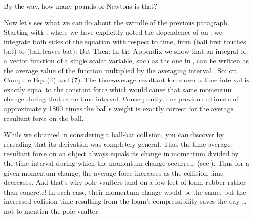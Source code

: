 {\tryit By the way, how many pounds or Newtons is that?

Now let's see what we can do about the  swindle of the
previous paragraph.
Starting with , where we have explicitly noted the
dependence of  on , we integrate both sides of the equation with
respect to time, from  (ball first touches bat) to 
(ball leaves bat):
%
%
But
%
%
Then:
%
%
In the Appendix we show that an integral of a vector function of a single
scalar variable, such as the one in , can be written as the average
value of the function  multiplied by the averaging interval
.
So:
%
%
or:
%
%
Compare Eqs.\,(4) and (7).
The time-average resultant force over a time interval  is exactly
equal to the constant force which would cause that same momentum change
during that same time interval.
Consequently, our previous estimate of approximately 1800~times the ball's
weight is exactly correct for the average resultant force on the ball.



While we obtained  in considering a
ball-bat collision, you can discover by rereading that its derivation was
completely general.
Thus the time-average resultant force on an object always equals its change
in momentum divided by the time interval during which the momentum change
occurred:  (see ).
Thus for a given momentum change, the average force increases as the
collision time decreases.
And that's why pole vaulters land on a few feet of foam rubber rather than
concrete!
In each case, their momentum change would be the same, but the increased
collision time resulting from the foam's compressibility saves the day \ldots
not to mention the pole vaulter.

}
